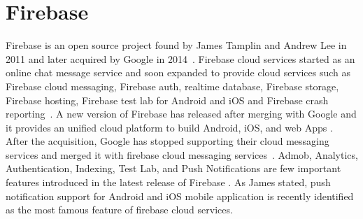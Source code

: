 \section{Firebase}

Firebase is an open source project found by James Tamplin and Andrew
Lee in 2011 and later acquired by Google in
2014~\cite{hid-sp18-409-www-firebase}. Firebase cloud services started
as an online chat message service and soon expanded to provide cloud
services such as Firebase cloud messaging, Firebase auth, realtime
database, Firebase storage, Firebase hosting, Firebase test lab for
Android and iOS and Firebase crash
reporting~\cite{hid-sp18-409-www-firebase-official}. A new version of
Firebase has released after merging with Google and it provides an
unified cloud platform to build Android, iOS, and web Apps
\cite{hid-sp18-409-www-firebase-official}. After the acquisition,
Google has stopped supporting their cloud messaging services and
merged it with firebase cloud messaging
services~\cite{hid-sp18-409-www-firebase-merged}. Admob, Analytics,
Authentication, Indexing, Test Lab, and Push Notifications are few
important features introduced in the latest release of Firebase
\cite{hid-sp18-409-www-firebase-official}. As James
\cite{hid-sp18-409-www-firebase} stated, push notification support for
Android and iOS mobile application is recently identified as the most
famous feature of firebase cloud services.

